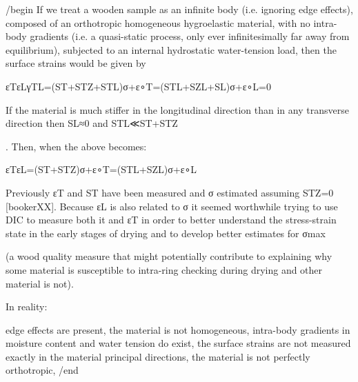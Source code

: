 /begin If we treat a wooden sample as an infinite body (i.e. ignoring edge effects), composed of an orthotropic homogeneous hygroelastic material, with no intra-body gradients (i.e. a quasi-static process, only ever infinitesimally far away from equilibrium), subjected to an internal hydrostatic water-tension load, then the surface strains would be given by

εTεLγTL=(ST+STZ+STL)σ+ε∘T=(STL+SZL+SL)σ+ε∘L=0

If the material is much stiffer in the longitudinal direction than in any transverse direction then SL≈0
and STL≪ST+STZ

. Then, when the above becomes:

εTεL=(ST+STZ)σ+ε∘T=(STL+SZL)σ+ε∘L

Previously εT
and ST have been measured and σ estimated assuming STZ=0 [bookerXX]. Because εL is also related to σ it seemed worthwhile trying to use DIC to measure both it and εT in order to better understand the stress-strain state in the early stages of drying and to develop better estimates for σmax

(a wood quality measure that might potentially contribute to explaining why some material is susceptible to intra-ring checking during drying and other material is not).

In reality:

    edge effects are present,
    the material is not homogeneous,
    intra-body gradients in moisture content and water tension do exist,
    the surface strains are not measured exactly in the material principal directions,
    the material is not perfectly orthotropic,          /end 